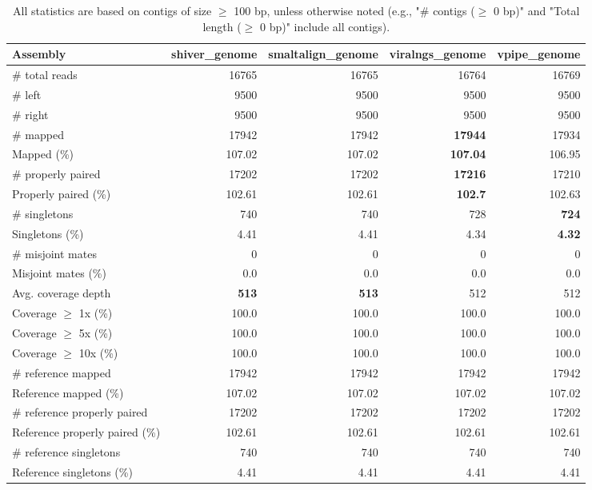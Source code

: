 \documentclass[12pt,a4paper]{article}
\begin{document}
\begin{table}[ht]
\begin{center}
\caption{All statistics are based on contigs of size $\geq$ 100 bp, unless otherwise noted (e.g., "\# contigs ($\geq$ 0 bp)" and "Total length ($\geq$ 0 bp)" include all contigs).}
\begin{tabular}{|l*{4}{|r}|}
\hline
Assembly & shiver\_genome & smaltalign\_genome & viralngs\_genome & vpipe\_genome \\ \hline
\# total reads & 16765 & 16765 & 16764 & 16769 \\ \hline
\# left & 9500 & 9500 & 9500 & 9500 \\ \hline
\# right & 9500 & 9500 & 9500 & 9500 \\ \hline
\# mapped & 17942 & 17942 & {\bf 17944} & 17934 \\ \hline
Mapped (\%) & 107.02 & 107.02 & {\bf 107.04} & 106.95 \\ \hline
\# properly paired & 17202 & 17202 & {\bf 17216} & 17210 \\ \hline
Properly paired (\%) & 102.61 & 102.61 & {\bf 102.7} & 102.63 \\ \hline
\# singletons & 740 & 740 & 728 & {\bf 724} \\ \hline
Singletons (\%) & 4.41 & 4.41 & 4.34 & {\bf 4.32} \\ \hline
\# misjoint mates & 0 & 0 & 0 & 0 \\ \hline
Misjoint mates (\%) & 0.0 & 0.0 & 0.0 & 0.0 \\ \hline
Avg. coverage depth & {\bf 513} & {\bf 513} & 512 & 512 \\ \hline
Coverage $\geq$ 1x (\%) & 100.0 & 100.0 & 100.0 & 100.0 \\ \hline
Coverage $\geq$ 5x (\%) & 100.0 & 100.0 & 100.0 & 100.0 \\ \hline
Coverage $\geq$ 10x (\%) & 100.0 & 100.0 & 100.0 & 100.0 \\ \hline
\# reference mapped & 17942 & 17942 & 17942 & 17942 \\ \hline
Reference mapped (\%) & 107.02 & 107.02 & 107.02 & 107.02 \\ \hline
\# reference properly paired & 17202 & 17202 & 17202 & 17202 \\ \hline
Reference properly paired (\%) & 102.61 & 102.61 & 102.61 & 102.61 \\ \hline
\# reference singletons & 740 & 740 & 740 & 740 \\ \hline
Reference singletons (\%) & 4.41 & 4.41 & 4.41 & 4.41 \\ \hline

\end{tabular}
\end{center}
\end{table}
\end{document}
